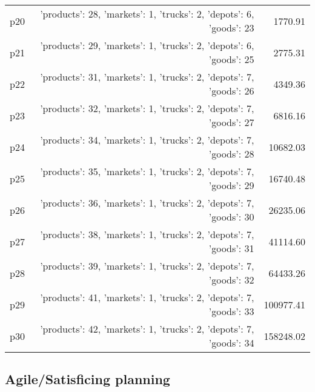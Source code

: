 \documentclass{article}
\begin{document}
\begin{center}
\begin{tabular}{@{}l|r|r@{}}
  p20&{'products': 28, 'markets': 1, 'trucks': 2, 'depots': 6, 'goods': 23}&1770.91\\
  p21&{'products': 29, 'markets': 1, 'trucks': 2, 'depots': 6, 'goods': 25}&2775.31\\
  p22&{'products': 31, 'markets': 1, 'trucks': 2, 'depots': 7, 'goods': 26}&4349.36\\
  p23&{'products': 32, 'markets': 1, 'trucks': 2, 'depots': 7, 'goods': 27}&6816.16\\
  p24&{'products': 34, 'markets': 1, 'trucks': 2, 'depots': 7, 'goods': 28}&10682.03\\
  p25&{'products': 35, 'markets': 1, 'trucks': 2, 'depots': 7, 'goods': 29}&16740.48\\
  p26&{'products': 36, 'markets': 1, 'trucks': 2, 'depots': 7, 'goods': 30}&26235.06\\
  p27&{'products': 38, 'markets': 1, 'trucks': 2, 'depots': 7, 'goods': 31}&41114.60\\
  p28&{'products': 39, 'markets': 1, 'trucks': 2, 'depots': 7, 'goods': 32}&64433.26\\
  p29&{'products': 41, 'markets': 1, 'trucks': 2, 'depots': 7, 'goods': 33}&100977.41\\
  p30&{'products': 42, 'markets': 1, 'trucks': 2, 'depots': 7, 'goods': 34}&158248.02
                            \end{tabular}
                            \end{center}
                    

                                \subsection*{Agile/Satisficing planning}
                                
\end{document}
